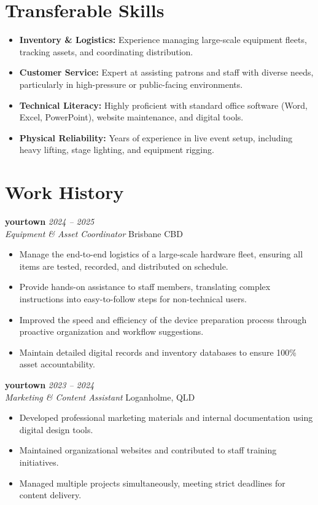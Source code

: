 \documentclass[11pt, a4paper]{article}
\begin{document}
\section{Transferable Skills}
\begin{itemize}
    \item \textbf{Inventory \& Logistics:} Experience managing large-scale equipment fleets, tracking assets, and coordinating distribution.
    \item \textbf{Customer Service:} Expert at assisting patrons and staff with diverse needs, particularly in high-pressure or public-facing environments.
    \item \textbf{Technical Literacy:} Highly proficient with standard office software (Word, Excel, PowerPoint), website maintenance, and digital tools.
    \item \textbf{Physical Reliability:} Years of experience in live event setup, including heavy lifting, stage lighting, and equipment rigging.
\end{itemize}

\section{Work History}

\textbf{yourtown} \hfill \textit{2024 – 2025} \\
\textit{Equipment \& Asset Coordinator} \hfill Brisbane CBD
\begin{itemize}
    \item Manage the end-to-end logistics of a large-scale hardware fleet, ensuring all items are tested, recorded, and distributed on schedule.
    \item Provide hands-on assistance to staff members, translating complex instructions into easy-to-follow steps for non-technical users.
    \item Improved the speed and efficiency of the device preparation process through proactive organization and workflow suggestions.
    \item Maintain detailed digital records and inventory databases to ensure 100\% asset accountability.
\end{itemize}

\vspace{8pt}

\textbf{yourtown} \hfill \textit{2023 – 2024} \\
\textit{Marketing \& Content Assistant} \hfill Loganholme, QLD
\begin{itemize}
    \item Developed professional marketing materials and internal documentation using digital design tools.
    \item Maintained organizational websites and contributed to staff training initiatives.
    \item Managed multiple projects simultaneously, meeting strict deadlines for content delivery.
\end{itemize}
\end{document}
